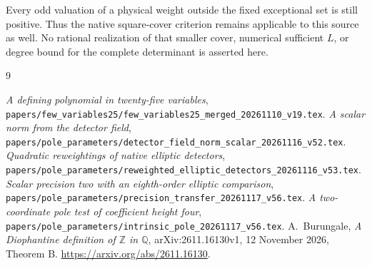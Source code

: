 \documentclass[11pt,a4paper]{article}
\newcommand{\Q}{\mathbb Q}\newcommand{\Z}{\mathbb Z}
\begin{document}
Every odd valuation of a physical weight outside the fixed
exceptional set is still positive. Thus the native square-cover
criterion remains applicable to this source as well. No rational
realization of that smaller cover, numerical sufficient \(L\), or
degree bound for the complete determinant is asserted here.

\begin{thebibliography}{9}\raggedright
{}\emph{A defining polynomial in twenty-five variables},
\nolinkurl{papers/few_variables25/few_variables25_merged_20261110_v19.tex}.
\emph{A scalar norm from the detector field},
\nolinkurl{papers/pole_parameters/detector_field_norm_scalar_20261116_v52.tex}.
\emph{Quadratic reweightings of native elliptic detectors},
\nolinkurl{papers/pole_parameters/reweighted_elliptic_detectors_20261116_v53.tex}.
\emph{Scalar precision two with an eighth-order elliptic comparison},
\nolinkurl{papers/pole_parameters/precision_transfer_20261117_v56.tex}.
\emph{A two-coordinate pole test of coefficient height four},
\nolinkurl{papers/pole_parameters/intrinsic_pole_20261117_v56.tex}.
A.~Burungale,
\emph{A Diophantine definition of $\Z$ in $\Q$},
arXiv:2611.16130v1, 12 November 2026, Theorem B.
\url{https://arxiv.org/abs/2611.16130}.
\end{thebibliography}
\end{document}
